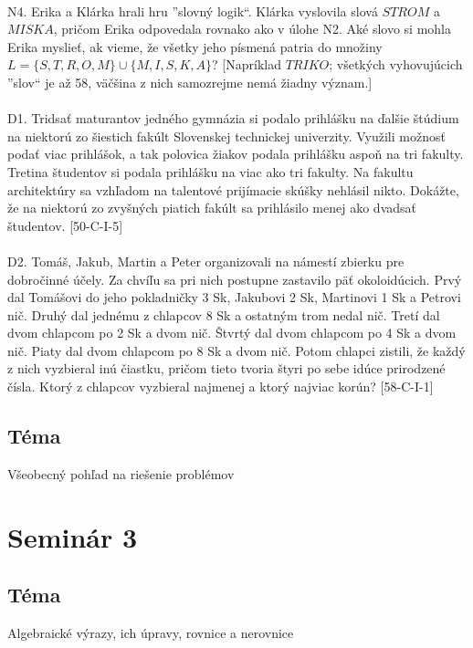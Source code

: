 \\
N4. Erika a Klárka hrali hru ”slovný logik“. Klárka vyslovila slová $STROM$ a $MISKA$, pričom Erika odpovedala rovnako ako v úlohe N2. Aké slovo si mohla Erika myslieť, ak vieme, že všetky jeho písmená patria do množiny $L = \{ S, T, R, O, M \} \cup \{M, I, S, K, A\}$?
[Napríklad $TRIKO$; všetkých vyhovujúcich ”slov“ je až 58, väčšina z nich samozrejme nemá žiadny význam.]\\
\\
D1. Tridsať maturantov jedného gymnázia si podalo prihlášku na ďalšie štúdium na niektorú zo šiestich fakúlt Slovenskej technickej univerzity. Využili možnosť podať viac prihlášok, a tak polovica žiakov podala prihlášku aspoň na tri fakulty. Tretina študentov si podala prihlášku na viac ako tri fakulty. Na fakultu architektúry sa vzhľadom na talentové prijímacie skúšky nehlásil nikto. Dokážte, že na niektorú zo zvyšných piatich fakúlt sa prihlásilo menej ako dvadsať študentov. [50-C-I-5]\\
\\
D2. Tomáš, Jakub, Martin a Peter organizovali na námestí zbierku pre dobročinné účely. Za chvíľu sa pri nich postupne zastavilo päť okoloidúcich. Prvý dal Tomášovi do jeho pokladničky 3 Sk, Jakubovi 2 Sk, Martinovi 1 Sk a Petrovi nič. Druhý dal jednému z chlapcov 8 Sk a ostatným trom nedal nič. Tretí dal dvom chlapcom po 2 Sk a dvom nič. Štvrtý dal dvom chlapcom po 4 Sk a dvom nič. Piaty dal dvom chlapcom po 8 Sk a dvom nič. Potom chlapci zistili, že každý z nich vyzbieral inú čiastku, pričom tieto tvoria štyri po sebe idúce prirodzené čísla. Ktorý z chlapcov vyzbieral najmenej a ktorý najviac korún? [58-C-I-1]







\subsection*{Téma}
Všeobecný pohľad na riešenie problémov



\section*{Seminár 3}
\subsection*{Téma}
Algebraické výrazy, ich úpravy, rovnice a nerovnice

